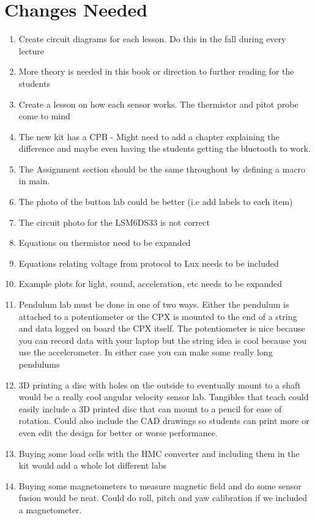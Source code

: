 \documentclass{article}
\begin{document}
\section*{Changes Needed}

\begin{enumerate}[itemsep=-5pt]
\item Create circuit diagrams for each lesson. Do this in the fall during every lecture
\item More theory is needed in this book or direction to further
  reading for the students
\item Create a lesson on how each sensor works. The thermistor and pitot probe come to mind 
\item The new kit has a CPB - Might need to add a chapter explaining the difference and maybe even having the students getting the bluetooth to work. 
\item The Assignment section should be the same throughout by defining a macro in main.
\item The photo of the button lab could be better (i.e add labels to
  each item)
\item The circuit photo for the LSM6DS33 is not correct
\item Equations on thermistor need to be expanded
\item Equations relating voltage from protocol to Lux needs to be included
\item Example plots for light, sound, acceleration, etc needs to be expanded
\item Pendulum lab must be done in one of two ways. Either the pendulum is attached to a potentiometer or the CPX is mounted to the end of a string and data logged on board the CPX itself. The potentiometer is nice because you can record data with your laptop but the string idea is cool because you use the accelerometer. In either case you can make some really long pendulums
\item 3D printing a disc with holes on the outside to eventually mount to a shaft would be a really cool angular velocity sensor lab. Tangibles that teach could easily include a 3D printed disc that can mount to a pencil for ease of rotation. Could also include the CAD drawings so students can print more or even edit the design for better or worse performance.
\item Buying some load cells with the HMC converter and including them in the kit would add a whole lot different labs
\item Buying some magnetometers to measure magnetic field and do some sensor fusion would be neat. Could do roll, pitch and yaw calibration if we included a magnetometer.

\end{enumerate}
\end{document}
